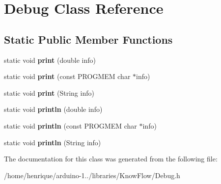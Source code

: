 \hypertarget{class_debug}{}\section{Debug Class Reference}
\label{class_debug}
\subsection*{Static Public Member Functions}
\begin{DoxyCompactItemize}
\item 
static void {\bfseries print} (double info)\hypertarget{class_debug_ad89acbb1466c676e4260cf81c49b2210}{}\label{class_debug_ad89acbb1466c676e4260cf81c49b2210}

\item 
static void {\bfseries print} (const P\+R\+O\+G\+M\+EM char $\ast$info)\hypertarget{class_debug_a8dc69dea7a41a650305fe39ecd041ea2}{}\label{class_debug_a8dc69dea7a41a650305fe39ecd041ea2}

\item 
static void {\bfseries print} (String info)\hypertarget{class_debug_a3881a087329fd06da726f4f1bb1779fb}{}\label{class_debug_a3881a087329fd06da726f4f1bb1779fb}

\item 
static void {\bfseries println} (double info)\hypertarget{class_debug_ae3a81b2a67d642065dabc9f8bac8a140}{}\label{class_debug_ae3a81b2a67d642065dabc9f8bac8a140}

\item 
static void {\bfseries println} (const P\+R\+O\+G\+M\+EM char $\ast$info)\hypertarget{class_debug_a50ff4dacbab49f4ed0b24605498a71f9}{}\label{class_debug_a50ff4dacbab49f4ed0b24605498a71f9}

\item 
static void {\bfseries println} (String info)\hypertarget{class_debug_ac151110846064657ecc902c53900b942}{}\label{class_debug_ac151110846064657ecc902c53900b942}

\end{DoxyCompactItemize}


The documentation for this class was generated from the following file\+:\begin{DoxyCompactItemize}
\item 
/home/henrique/arduino-\/1../libraries/\+Know\+Flow/Debug.\+h\end{DoxyCompactItemize}
